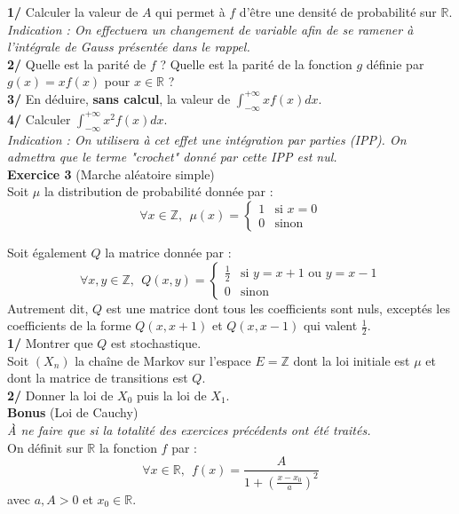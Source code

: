 \documentclass[a4paper,12pt]{article}
\begin{document}
\textbf{1/} Calculer la valeur de $A$ qui permet à $f$ d'être une densité de probabilité sur $\mathbb{R}$. \\
\textit{Indication : On effectuera un changement de variable afin de se ramener à l'intégrale de Gauss présentée dans le rappel.} \\

\textbf{2/} Quelle est la parité de $f$ ? Quelle est la parité de la fonction $g$ définie par $g(x)=xf(x)$ pour $x \in \mathbb{R}$ ?\\

\textbf{3/} En déduire, \textbf{sans calcul}, la valeur de $\int_{-\infty}^{+ \infty} x f(x) dx$. \\

\textbf{4/} Calculer $\int_{-\infty}^{+ \infty} x^2 f(x) dx$. \\
\textit{Indication : On utilisera à cet effet une intégration par parties (IPP). On admettra que le terme "crochet" donné par cette IPP est nul.} \\

\textbf{Exercice 3} (Marche aléatoire simple) \\
Soit $\mu$ la distribution de probabilité donnée par :
$$
\forall x \in \mathbb{Z}, \ \ \mu(x) =
\begin{cases} 
1 & \text{si } x=0  \\
0 & \text{sinon}
\end{cases}
$$

Soit également $Q$ la matrice donnée par :
$$
\forall x,y \in \mathbb{Z}, \ \ Q(x, y) =
\begin{cases} 
\frac{1}{2} & \text{si } y = x + 1 \text{ ou } y = x - 1 \\
0 & \text{sinon}
\end{cases}
$$
Autrement dit, $Q$ est une matrice dont tous les coefficients sont nuls, exceptés les coefficients de la forme $Q(x,x+1)$ et $Q(x,x-1)$ qui valent $\frac{1}{2}$. \\

\textbf{1/} Montrer que $Q$ est stochastique. \\

Soit $(X_n)$ la chaîne de Markov sur l'espace $E=\mathbb{Z}$ dont la loi initiale est $\mu$ et dont la matrice de transitions est $Q$. \\

\textbf{2/} Donner la loi de $X_0$ puis la loi de $X_1$. \\

\textbf{Bonus} (Loi de Cauchy) \\
\textit{À ne faire que si la totalité des exercices précédents ont été traités.} \\
On définit sur $\mathbb{R}$ la fonction $f$ par : 
$$\forall x \in \mathbb{R}, \ \ f(x)=\frac{A}{1+\left( \frac{x-x_0}{a}  \right)^2}$$ 
avec $a, A >0$ et $x_0 \in \mathbb{R}$.\\
\end{document}
